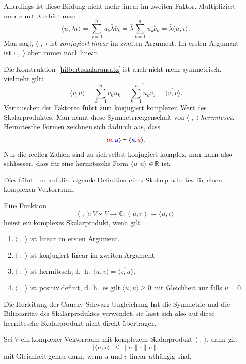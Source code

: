 Allerdings ist diese Bildung nicht mehr linear im zweiten Faktor.
Multipliziert man $v$ mit $\lambda$ erhält man
\[
\langle u,\lambda v\rangle
=
\sum_{k=1}^n u_k\bar{\lambda} \bar{v}_k
=
\bar{\lambda}\sum_{k=1}^n u_k\bar{v}_k
=
\bar{\lambda}\langle u,v\rangle.
\]
Man sagt, $\langle\;,\;\rangle$ ist {\em konjugiert linear} im zweiten Argument.
Im ersten Argument ist $\langle\;,\;\rangle$ aber immer noch linear.

Die Konstruktion~\eqref{hilbert:skalaransatz} ist auch nicht mehr
symmetrisch, vielmehr gilt:
\[
\langle v,u\rangle
=
\sum_{k=1}^n v_k\bar{u}_k
=
\overline{\sum_{k=1}^n u_k\bar{v}_k}
=
\overline{\langle u,v\rangle}.
\]
Vertauschen der Faktoren führt zum konjugiert komplexen Wert des
Skalarproduktes.
Man nennt diese Symmetrieeigenschaft von $\langle\;,\;\rangle$
{\em hermitesch}.
Hermitesche Formen zeichnen sich dadurch aus, dass
\[
\overline{\langle {\color{red}u},{\color{blue}u}\rangle}
=
\langle {\color{blue}u},{\color{red}u}\rangle.
\]
Nur die reellen Zahlen sind zu sich selbst konjugiert komplex, man kann
also schliessen, dass für eine hermitesche Form
$\langle u,u\rangle\in\mathbb R$ ist.

Dies führt uns auf die folgende Definition eines Skalarproduktes für einen
komplexen Vektorraum.
\begin{definition}
Eine Funktion
\[
\langle\;,\;\rangle
\colon V\times V\to \mathbb C : (u,v) \mapsto \langle u,v\rangle
\]
heisst ein komplexes Skalarprodukt, wenn gilt:
\begin{enumerate}
\item $\langle \;,\;\rangle$ ist linear im ersten Argument.
\item $\langle \;,\;\rangle$ ist konjugiert linear im zweiten Argument.
\item $\langle\;,\;\rangle$ ist hermitesch,
d.~h.~$\langle u,v\rangle=\overline{\langle v,u\rangle}$.
\item $\langle \;,\;\rangle$ ist positiv definit, d.~h.~es gilt
$\langle u,u\rangle \ge 0$ mit Gleichheit nur falls $u=0$.
\end{enumerate}
\end{definition}

Die Herleitung der Cauchy-Schwarz-Ungleichung hat die Symmetrie
und die Bilinearität des Skalarproduktes verwendet, sie lässt sich
also auf diese hermitesche Skalarprodukt nicht direkt übertragen.

\begin{satz}
Sei $V$ ein komplexer Vektorraum mit komplexem Skalarprodukt
$\langle\;,\;\rangle$,
dann gilt
\[
|\langle u,v\rangle| \le \|u\|\cdot \|v\|
\]
mit Gleichheit genau dann, wenn $u$ und $v$ linear abhängig sind.
\end{satz}

